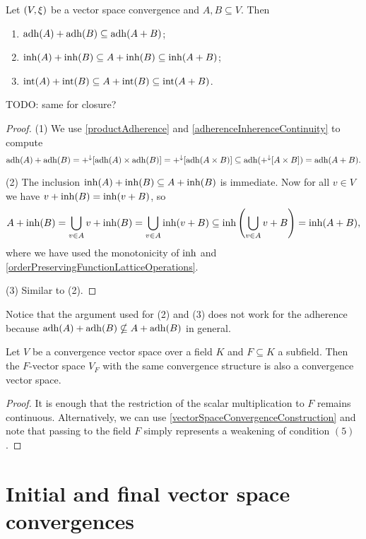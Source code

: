 \begin{proposition} \label{vectorSumInherenceAdherence}
Let $\left( V,\xi \right)$ be a vector space convergence and $A,B\subseteq V$. Then
\begin{enumerate}
\item $\operatorname{adh}(A)+\operatorname{adh}(B) \subseteq \operatorname{adh}(A+B)$;
\item $\operatorname{inh}(A)+\operatorname{inh}(B) \subseteq A+\operatorname{inh}(B) \subseteq \operatorname{inh}(A+B)$;
\item $\operatorname{int}(A)+\operatorname{int}(B) \subseteq A+\operatorname{int}(B) \subseteq \operatorname{int}(A+B)$.
\end{enumerate}
\end{proposition}
TODO: same for closure?
\begin{proof}
(1) We use \ref{productAdherence} and \ref{adherenceInherenceContinuity} to compute
\[ \operatorname{adh}(A)+\operatorname{adh}(B) = +^\downarrow[\operatorname{adh}(A)\times\operatorname{adh}(B)] = +^\downarrow[\operatorname{adh}(A\times B)] \subseteq \operatorname{adh}(+^\downarrow[A\times B]) = \operatorname{adh}(A+B). \]

(2) The inclusion $\operatorname{inh}(A)+\operatorname{inh}(B) \subseteq A+\operatorname{inh}(B)$ is immediate. Now for all $v\in V$ we have $v+\operatorname{inh}(B) = \operatorname{inh}(v+B)$, so
\[ A+\operatorname{inh}(B) = \bigcup_{v\in A}v+\operatorname{inh}(B) = \bigcup_{v\in A}\operatorname{inh}(v+B) \subseteq \operatorname{inh}\left(\bigcup_{v\in A} v+B\right) = \operatorname{inh}(A+B), \]
where we have used the monotonicity of $\operatorname{inh}$ and \ref{orderPreservingFunctionLatticeOperations}.

(3) Similar to (2).
\end{proof}
Notice that the argument used for (2) and (3) does not work for the adherence because $\operatorname{adh}(A)+\operatorname{adh}(B) \nsubseteq A+\operatorname{adh}(B)$ in general.

\begin{lemma}
Let $V$ be a convergence vector space over a field $K$ and $F\subseteq K$ a subfield. Then the $F$-vector space $V_F$ with the same convergence structure is also a convergence vector space.
\end{lemma}
\begin{proof}
It is enough that the restriction of the scalar multiplication to $F$ remains continuous. Alternatively, we can use \ref{vectorSpaceConvergenceConstruction} and note that passing to the field $F$ simply represents a weakening of condition $(5)$.
\end{proof}


\section{Initial and final vector space convergences}
